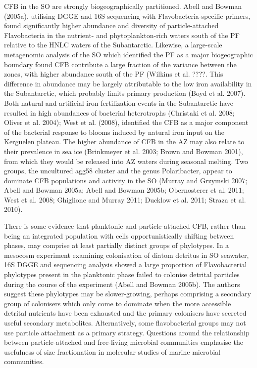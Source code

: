CFB in the SO are strongly biogeographically partitioned. Abell and Bowman (2005a), utilising DGGE and 16S sequencing with Flavobacteria-specific primers, found significantly higher abundance and diversity of particle-attached Flavobacteria in the nutrient- and phytoplankton-rich waters south of the PF relative to the HNLC waters of the Subantarctic. Likewise, a large-scale metagenomic analysis of the SO which identified the PF as a major biogeographic boundary found CFB contribute a large fraction of the variance between the zones, with higher abundance south of the PF (Wilkins et al. ????. This difference in abundance may be largely attributable to the low iron availability in the Subantarctic, which probably limits primary production (Boyd et al. 2007). Both natural and artificial iron fertilization events in the Subantarctic have resulted in high abundances of bacterial heterotrophs (Christaki et al. 2008; Oliver et al. 2004); West et al. (2008), identified the CFB as a major component of the bacterial response to blooms induced by natural iron input on the Kerguelen plateau. The higher abundance of CFB in the AZ may also relate to their prevalence in sea ice (Brinkmeyer et al. 2003; Brown and Bowman 2001), from which they would be released into AZ waters during seasonal melting. Two groups, the uncultured agg58 cluster and the genus Polaribacter, appear to dominate CFB populations and activity in the SO (Murray and Grzymski 2007; Abell and Bowman 2005a; Abell and Bowman 2005b; Obernosterer et al. 2011; West et al. 2008; Ghiglione and Murray 2011; Ducklow et al. 2011; Straza et al. 2010).

There is some evidence that planktonic and particle-attached CFB, rather than being an integrated population with cells opportunistically shifting between phases, may comprise at least partially distinct groups of phylotypes. In a mesocosm experiment examining colonisation of diatom detritus in SO seawater, 16S DGGE and sequencing analysis showed a large proportion of Flavobacterial phylotypes present in the planktonic phase failed to colonise detrital particles during the course of the experiment (Abell and Bowman 2005b). The authors suggest these phylotypes may be slower-growing, perhaps comprising a secondary group of colonisers which only come to dominate when the more accessible detrital nutrients have been exhausted and the primary colonisers have secreted useful secondary metabolites. Alternatively, some flavobacterial groups may not use particle attachment as a primary strategy. Questions around the relationship between particle-attached and free-living microbial communities emphasise the usefulness of size fractionation in molecular studies of marine microbial communities.

